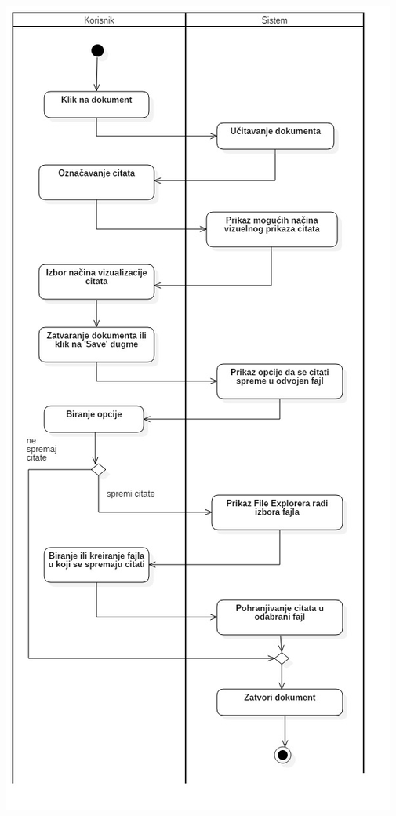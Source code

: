 \begin{center}
    \includegraphics[scale=0.4]{images/ArhiviranjeCitatauPosebnomFajlu.png}
\end{center}

